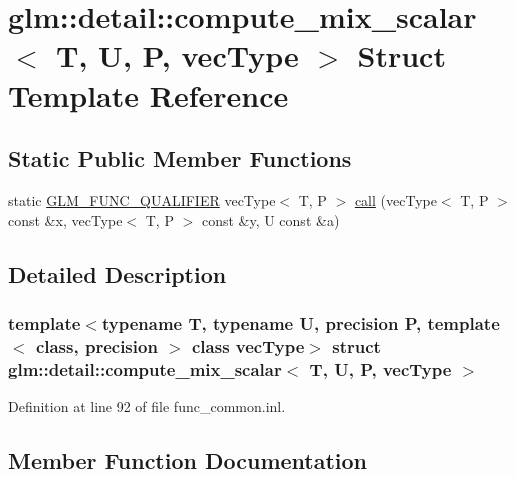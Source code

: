 \hypertarget{structglm_1_1detail_1_1compute__mix__scalar}{}\section{glm\+:\+:detail\+:\+:compute\+\_\+mix\+\_\+scalar$<$ T, U, P, vec\+Type $>$ Struct Template Reference}
\label{structglm_1_1detail_1_1compute__mix__scalar}
\subsection*{Static Public Member Functions}
\begin{DoxyCompactItemize}
\item 
static \hyperlink{setup_8hpp_a33fdea6f91c5f834105f7415e2a64407}{G\+L\+M\+\_\+\+F\+U\+N\+C\+\_\+\+Q\+U\+A\+L\+I\+F\+I\+ER} vec\+Type$<$ T, P $>$ \hyperlink{structglm_1_1detail_1_1compute__mix__scalar_a15fb89e5dac67f6645419fd7eaebdc5f}{call} (vec\+Type$<$ T, P $>$ const \&x, vec\+Type$<$ T, P $>$ const \&y, U const \&a)
\end{DoxyCompactItemize}


\subsection{Detailed Description}
\subsubsection*{template$<$typename T, typename U, precision P, template$<$ class, precision $>$ class vec\+Type$>$\newline
struct glm\+::detail\+::compute\+\_\+mix\+\_\+scalar$<$ T, U, P, vec\+Type $>$}



Definition at line 92 of file func\+\_\+common.\+inl.



\subsection{Member Function Documentation}
\mbox{\label{structglm_1_1detail_1_1compute__mix__scalar_a15fb89e5dac67f6645419fd7eaebdc5f}} 
